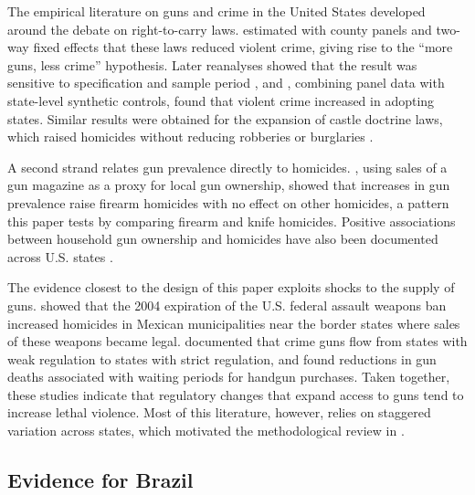\documentclass[11pt,a4paper]{article}
\begin{document}
The empirical literature on guns and crime in the United States developed around the debate on right-to-carry laws. \citet{lott1997} estimated with county panels and two-way fixed effects that these laws reduced violent crime, giving rise to the ``more guns, less crime'' hypothesis. Later reanalyses showed that the result was sensitive to specification and sample period \citep{ayres2003}, and \citet{donohue2019}, combining panel data with state-level synthetic controls, found that violent crime increased in adopting states. Similar results were obtained for the expansion of castle doctrine laws, which raised homicides without reducing robberies or burglaries \citep{cheng2013}.

A second strand relates gun prevalence directly to homicides. \citet{duggan2001}, using sales of a gun magazine as a proxy for local gun ownership, showed that increases in gun prevalence raise firearm homicides with no effect on other homicides, a pattern this paper tests by comparing firearm and knife homicides. Positive associations between household gun ownership and homicides have also been documented across U.S. states \citep{miller2007,siegel2013}.

The evidence closest to the design of this paper exploits shocks to the supply of guns. \citet{dube2013} showed that the 2004 expiration of the U.S. federal assault weapons ban increased homicides in Mexican municipalities near the border states where sales of these weapons became legal. \citet{knight2013} documented that crime guns flow from states with weak regulation to states with strict regulation, and \citet{luca2017} found reductions in gun deaths associated with waiting periods for handgun purchases. Taken together, these studies indicate that regulatory changes that expand access to guns tend to increase lethal violence. Most of this literature, however, relies on staggered variation across states, which motivated the methodological review in \citet{benmichael2024}.

\subsection{Evidence for Brazil}
\end{document}

